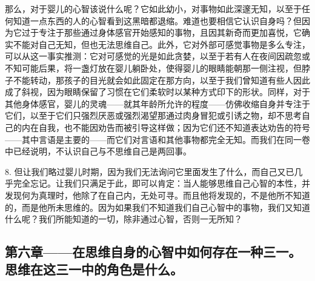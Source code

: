 那么，对于婴儿的心智该说什么呢？它如此幼小，对事物如此深邃无知，以至于任何知道一点东西的人的心智看到这黑暗都退缩。难道也要相信它认识自身吗？但因为它过于专注于那些通过身体感官开始感知的事物，且因其新奇而更加喜悦，它确实不能对自己无知，但也无法思维自己。此外，它对外部可感觉事物是多么专注，可以从这一事实推测：它对可感觉的光是如此贪婪，以至于若有人在夜间因疏忽或不知可能后果，将一盏灯放在婴儿躺卧处，使得婴儿的眼睛能朝那一侧注视，但脖子不能转动，那孩子的目光就会如此固定在那方向，以至于我们曾知道有些人因此成了斜视，因为眼睛保留了习惯在它们柔软时以某种方式印下的形状。同样，对于其他身体感官，婴儿的灵魂——就其年龄所允许的程度——仿佛收缩自身并专注于它们，以至于它们只强烈厌恶或强烈渴望那通过肉身冒犯或引诱之物，却不思考自己的内在自我，也不能因劝告而被引导这样做；因为它们还不知道表达劝告的符号——其中言语是主要的——而它们对言语和其他事物都完全无知。而我们在同一卷中已经说明，不认识自己与不思维自己是两回事。\par

8. 但让我们略过婴儿时期，因为我们无法询问它里面发生了什么，而自己又已几乎完全忘记。让我们只满足于此，即可以肯定：当人能够思维自己心智的本性，并发现何为真理时，他除了在自己内，无处可寻。而且他将发现的，不是他所不知道的，而是他所未思维的。因为如果我们不知道我们自己心智中的事物，我们又知道什么呢？我们所能知道的一切，除非通过心智，否则一无所知？\par


\subsection{第六章——在思维自身的心智中如何存在一种三一。思维在这三一中的角色是什么。}

